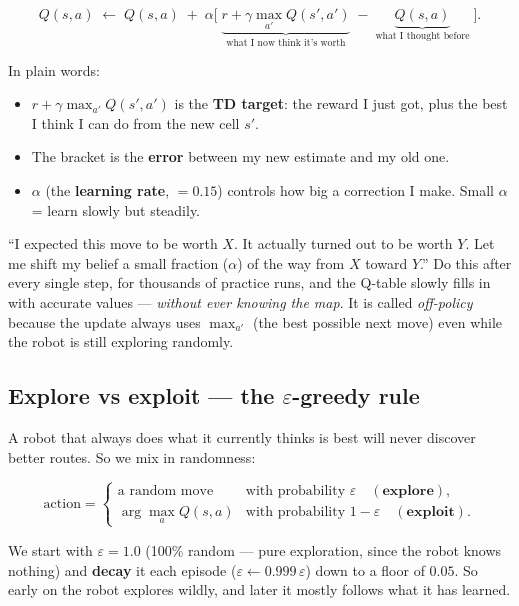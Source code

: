 \documentclass[11pt]{article}
\begin{document}
\begin{equation}
Q(s,a) \;\leftarrow\; Q(s,a) \;+\; \alpha
\Big[\;\underbrace{r + \gamma \max_{a'} Q(s',a')}_{\text{what I now think it's worth}}
\;-\; \underbrace{Q(s,a)}_{\text{what I thought before}}\;\Big].
\label{eq:qupdate}
\end{equation}

In plain words:
\begin{itemize}[nosep]
  \item $r + \gamma \max_{a'} Q(s',a')$ is the \textbf{TD target}: the reward I
        just got, plus the best I think I can do from the new cell $s'$.
  \item The bracket is the \textbf{error} between my new estimate and my old one.
  \item $\alpha$ (the \textbf{learning rate}, $=0.15$) controls how big a
        correction I make. Small $\alpha$ = learn slowly but steadily.
\end{itemize}

\begin{intuition}
``I expected this move to be worth $X$. It actually turned out to be worth $Y$.
Let me shift my belief a small fraction ($\alpha$) of the way from $X$ toward
$Y$.'' Do this after every single step, for thousands of practice runs, and the
Q-table slowly fills in with accurate values --- \emph{without ever knowing the
map}. It is called \emph{off-policy} because the update always uses
$\max_{a'}$ (the best possible next move) even while the robot is still exploring
randomly.
\end{intuition}

\subsection{Explore vs exploit --- the $\varepsilon$-greedy rule}
A robot that always does what it currently thinks is best will never discover
better routes. So we mix in randomness:

\begin{equation}
\text{action} =
\begin{cases}
\text{a random move} & \text{with probability } \varepsilon \quad(\textbf{explore}),\\
\arg\max_a Q(s,a) & \text{with probability } 1-\varepsilon \quad(\textbf{exploit}).
\end{cases}
\end{equation}

We start with $\varepsilon = 1.0$ (100\% random --- pure exploration, since the
robot knows nothing) and \textbf{decay} it each episode
($\varepsilon \leftarrow 0.999\,\varepsilon$) down to a floor of $0.05$. So early
on the robot explores wildly, and later it mostly follows what it has learned.
\end{document}
